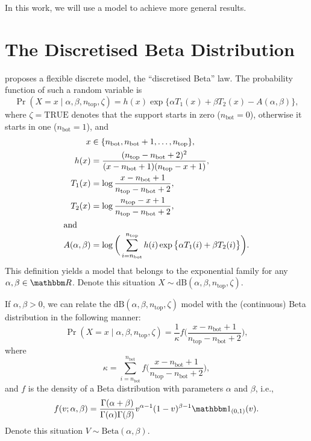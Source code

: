 \documentclass[12pt]{article}
\begin{document}
	In this work, we will use a model to achieve more general results.
	
	\section{The Discretised Beta Distribution}
	
	\citet{ANewVersatileDiscreteDistribution} proposes a flexible discrete model, the ``discretised Beta'' law.
	The probability function of such a random variable is
	\begin{equation}
		\Pr(X  = x \mid \alpha, \beta, n_{\text{top}}, \zeta) = h(x) \exp\big\{ \alpha T_1(x) + \beta T_2(x) - A(\alpha, \beta) \big\},
		\label{Eq:ProbdbExponential}
	\end{equation}
	where $\zeta=\text{TRUE}$ denotes that the support starts in zero ($n_{\text{bot}}=0$), otherwise it starts in one ($n_{\text{bot}}=1$), and
	\begin{align}
		x &\in \{n_{\text{bot}}, n_{\text{bot}}+1, \dots, n_{\text{top}}\},\\
		h(x) & =\frac{(n_{\text{top}} - n_{\text{bot}}+2)^2}{
			(x-n_{\text{bot}}+1)	(n_{\text{top}}-x+1)	},\\
		T_1(x) &= \log\frac{x-n_{\text{bot}}+1}{n_{\text{top}}-n_{\text{bot}}+2}, \\
		T_2(x) &= \log\frac{n_{\text{top}}-x+1}{n_{\text{top}}-n_{\text{bot}}+2}, \\
		\intertext{and}
		A(\alpha,\beta) &= \log \bigg(
		\sum_{i=n_{\text{bot}}}^{n_{\text{top}}} h(i) \exp\big\{ \alpha T_1(i) + \beta T_2(i)\big\}
		\bigg).
	\end{align}
	This definition yields a model that belongs to the exponential family for any $\alpha,\beta\in\mathbbm R$.
	Denote this situation $X\sim\text{dB}(\alpha,\beta, n_{\text{top}},\zeta)$.
	
	If $\alpha,\beta>0$, we can relate the $\text{dB}(\alpha,\beta, n_{\text{top}},\zeta)$ model with the (continuous) Beta distribution in the following manner:
	\begin{equation}
		\Pr(X=x \mid \alpha, \beta, n_{\text{top}}, \zeta) = 
		\frac{1}{\kappa} f\Big(
		\frac{x-n_{\text{bot}}+1}{n_{\text{top}}-n_{\text{bot}}+2}
		\Big),
		\label{Eq:Probdb}
	\end{equation}
	where
	$$
	\kappa = \sum_{i=n_{\text{bot}}}^{n_{\text{bot}}} f\Big(
	\frac{x-n_{\text{bot}}+1}{n_{\text{top}}-n_{\text{bot}}+2}
	\Big),
	$$
	and $f$ is the density of a Beta distribution with parameters $\alpha$ and $\beta$, i.e.,
	\begin{equation}
		f(v;\alpha, \beta) = \frac{\Gamma(\alpha+\beta)}{\Gamma(\alpha)\Gamma(\beta)} v^{\alpha-1} (1-v)^{\beta-1} \mathbbm 1_{(0,1)}(v).
		\label{Eq:DensBeta}
	\end{equation}
	Denote this situation $V\sim\text{Beta}(\alpha,\beta)$.
	
\end{document}
